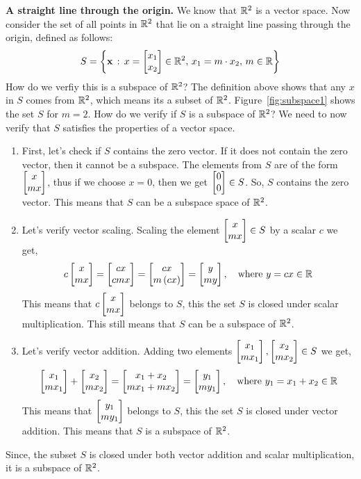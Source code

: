 \begin{boxedstuff}
\begin{example}
    \textbf{A straight line through the origin.} We know that $\mathbb{R}^2$ is a vector space. Now consider the set of all points in $\mathbb{R}^2$ that lie on a straight line passing through the origin, defined as follows:
    \[ S = \lc \mf{x} \, : \, x = \bmx x_1 \\ x_2 \emx \in \mb{R}^2, \, x_1 = m \cdot x_2, \, m \in \mb{R} \rc \]
    How do we verfiy this is a subspace of $\mathbb{R}^2$? The definition above shows that any $x$ in $S$ comes from $\mathbb{R}^2$, which means its a subset of $\mathbb{R}^2$. Figure~\ref{fig:subspace1} shows the set $S$ for $m = 2$.
    \noindent How do we verify if $S$ is a subspace of $\mathbb{R}^2$? We need to now verify that $S$ satisfies the properties of a vector space.
    \begin{enumerate}
        \item First, let's check if $S$ contains the zero vector. If it does not contain the zero vector, then it cannot be a subspace. The elements from $S$ are of the form $\bmxc x \\ m x\emx$, thus if we choose $x = 0$, then we get $\bmx 0 \\ 0 \emx \in S$. So, $S$ contains the zero vector. This means that $S$ can be a subspace space of $\mathbb{R}^2$.
        \item Let's verify vector scaling. Scaling the element $\bmxc x \\ m x \emx \in S$ by a scalar $c$ we get,
        \[ c \bmxc x \\ m x\emx = \bmxc c x \\ c m x \emx = \bmxc c x \\ m \pp{c x} \emx = \bmxc y \\ m y\emx, \quad \text{where} \,\, y = c x \in \mb{R} \]
        This means that $c\bmxc x \\ m x\emx$ belongs to $S$, this the set $S$ is closed under scalar multiplication. This still means that $S$ can be a subspace of $\mathbb{R}^2$.
        \item Let's verify vector addition. Adding two elements $\bmxc x_1 \\ m x_1\emx, \bmxc x_2 \\ m x_2\emx \in S$ we get,
        \[ \bmxc x_1 \\ m x_1\emx + \bmxc x_2 \\ m x_2\emx = \bmxc x_1 + x_2 \\ m x_1 + m x_2 \emx = \bmxc y_1 \\ m y_1\emx, \quad \text{where} \,\, y_1 = x_1 + x_2 \in \mb{R} \]
        This means that $\bmxc y_1 \\ m y_1\emx$ belongs to $S$, this the set $S$ is closed under vector addition. This means that $S$ is a subspace of $\mathbb{R}^2$.
    \end{enumerate}
    Since, the subset $S$ is closed under both vector addition and scalar multiplication, it is a subspace of $\mathbb{R}^2$.
    \label{example:subspace-straight-line}
\end{example}
\end{boxedstuff}
